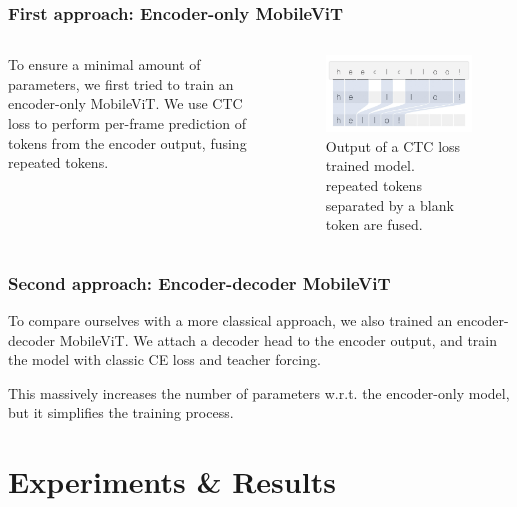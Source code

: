 \documentclass[english, xcolor={table}]{beamer}
\begin{document}
\begin{frame}
  \frametitle{First approach: Encoder-only MobileViT}

  \begin{columns}
    \begin{column}{0.6\textwidth}
      To ensure a \alert{minimal} amount of parameters, we first tried to train an encoder-only MobileViT. We use \alert{CTC loss} to perform per-frame prediction of tokens from the encoder output, fusing repeated tokens.
    \end{column}
    \begin{column}{0.4\textwidth}
      \begin{figure}
        \centering
        \includegraphics[width=1\textwidth]{figures/ctc_decoding.jpg}
        \caption{Output of a CTC loss trained model. repeated tokens separated by a blank token are fused.}
      \end{figure}
    \end{column}
  \end{columns}
\end{frame}

\begin{frame}
  \frametitle{Second approach: Encoder-decoder MobileViT}

    To compare ourselves with a more classical approach, we also trained an \alert{encoder-decoder} MobileViT. We attach a decoder head to the encoder output, and train the model with classic CE loss and teacher forcing.

    This \alert{massively} increases the number of parameters w.r.t. the encoder-only model, but it \alert{simplifies} the training process.

\end{frame}

\section{Experiments \& Results}
\end{document}
